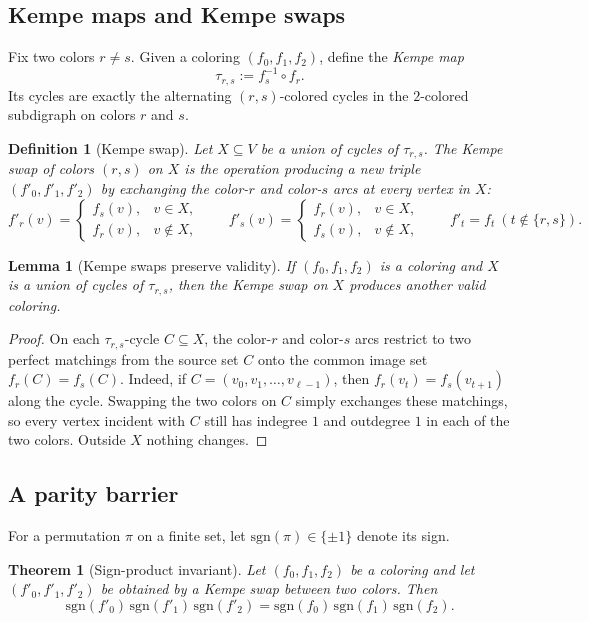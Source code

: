 \documentclass[11pt]{article}
\newtheorem{theorem}{Theorem}
\newtheorem{lemma}{Lemma}
\newtheorem{definition}{Definition}
\begin{document}
\subsection{Kempe maps and Kempe swaps}
Fix two colors $r\ne s$.
Given a coloring $(f_0,f_1,f_2)$, define the \emph{Kempe map}
\[
\tau_{r,s}:=f_s^{-1}\circ f_r.
\]
Its cycles are exactly the alternating $(r,s)$-colored cycles in the $2$-colored subdigraph on colors $r$ and $s$.

\begin{definition}[Kempe swap]
Let $X\subseteq V$ be a union of cycles of $\tau_{r,s}$.
The \emph{Kempe swap of colors $(r,s)$ on $X$} is the operation producing a new triple $(f'_0,f'_1,f'_2)$ by exchanging the color-$r$ and color-$s$ arcs at every vertex in $X$:
\[
f'_r(v)=
\begin{cases}
f_s(v), & v\in X,\\
f_r(v), & v\notin X,
\end{cases}
\qquad
f'_s(v)=
\begin{cases}
f_r(v), & v\in X,\\
f_s(v), & v\notin X,
\end{cases}
\qquad
f'_t=f_t\ (t\notin\{r,s\}).
\]
\end{definition}

\begin{lemma}[Kempe swaps preserve validity]\label{lem:kempe-valid}
If $(f_0,f_1,f_2)$ is a coloring and $X$ is a union of cycles of $\tau_{r,s}$, then the Kempe swap on $X$ produces another valid coloring.
\end{lemma}

\begin{proof}
On each $\tau_{r,s}$-cycle $C\subseteq X$, the color-$r$ and color-$s$ arcs restrict to two perfect matchings from the source set $C$ onto the common image set $f_r(C)=f_s(C)$.
Indeed, if $C=(v_0,v_1,\dots,v_{\ell-1})$, then $f_r(v_t)=f_s(v_{t+1})$ along the cycle.
Swapping the two colors on $C$ simply exchanges these matchings, so every vertex incident with $C$ still has indegree $1$ and outdegree $1$ in each of the two colors.
Outside $X$ nothing changes.
\end{proof}

\subsection{A parity barrier}
For a permutation $\pi$ on a finite set, let $\mathrm{sgn}(\pi)\in\{\pm1\}$ denote its sign.

\begin{theorem}[Sign-product invariant]\label{thm:sign-invariant}
Let $(f_0,f_1,f_2)$ be a coloring and let $(f'_0,f'_1,f'_2)$ be obtained by a Kempe swap between two colors.
Then
\[
\mathrm{sgn}(f'_0)\,\mathrm{sgn}(f'_1)\,\mathrm{sgn}(f'_2)
=
\mathrm{sgn}(f_0)\,\mathrm{sgn}(f_1)\,\mathrm{sgn}(f_2).
\]
\end{theorem}
\end{document}

